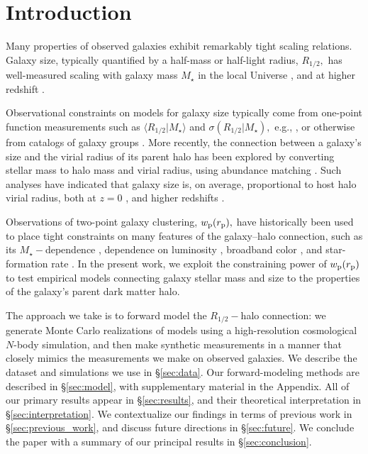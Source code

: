 \documentclass[usenatbib,usegraphicx,letterpaper]{mn2e}
\newcommand{\rhalf}{R_{1/2}}
\newcommand{\mstar}{M_{\star}}
\newcommand{\rproj}{r_{\rm p}}
\newcommand{\wproj}{w_{\rm p}}
\newcommand{\mean}[2]{\langle{#1}\vert{#2}\rangle}
\begin{document}
\section{Introduction}
\label{sec:intro}

Many properties of observed galaxies exhibit remarkably tight scaling relations. Galaxy size, typically quantified by a half-mass or half-light radius, $\rhalf,$ has well-measured scaling with galaxy mass $\mstar$ in the local Universe \citep{shen_etal03,huang_etal13,lange_etal15,zhang_yang17}, and at higher redshift \citep{trujillo_etal04,huertas_company_etal13a,vanderwel_etal14,kawamata_etal15,shibuya_etal15,huang_etal17}.

Observational constraints on models for galaxy size typically come from one-point function measurements such as $\mean{\rhalf}{\mstar}$ and $\sigma(\rhalf\vert\mstar),$ e.g.,  \citet{khochfar_silk06,lang_etal14,desmond_etal17,bottrell_etal17b,hou_etal17,somerville_etal17}, or otherwise from catalogs of galaxy groups \citep{weinmann_etal08,guo_etal09,huertas_company_etal13b,spindler_wake17}. More recently, the connection between a galaxy's size and the virial radius of its parent halo has been
explored by converting stellar mass to halo mass and virial radius, using abundance matching \citep{kravtsov_etal04,tasitsiomi_etal04,vale_ostriker04,vale_ostriker06,conroy_etal06}.  Such analyses have indicated that galaxy size is, on average, proportional to host halo virial radius, both at $z=0$ \citep{kravtsov13}, and higher redshifts \citep{huang_etal17,somerville_etal17}.

Observations of two-point galaxy clustering, $\wproj(\rproj),$ have historically been used to place tight constraints on many features of the galaxy--halo connection, such as its $\mstar-$dependence \citep{moster_etal10,leauthaud_etal11,reddick_etal13,skibba_etal15}, dependence on luminosity \citep{kravtsov_etal04, tasitsiomi_etal04,vale_ostriker04,vale_ostriker06,tinker_etal05,cacciato_etal13}, broadband color \citep{coil_etal08,zehavi_etal11,guo_etal11,hearin_watson13}, and star-formation rate \citep{wang_etal07,tinker_etal13,watson_etal14}. In the present work, we exploit the constraining power of $\wproj(\rproj)$ to test empirical models connecting galaxy stellar mass and size to the properties of the galaxy's parent dark matter halo.

The approach we take is to forward model the $\rhalf-$halo connection: we generate Monte Carlo realizations of models using a high-resolution cosmological $N$-body simulation, and then make synthetic measurements in a manner that closely mimics the measurements we make on observed galaxies. We describe the dataset and simulations we use in \S\ref{sec:data}. Our forward-modeling methods are described in \S\ref{sec:model}, with supplementary material in the Appendix. All of our primary results appear in \S\ref{sec:results}, and their theoretical interpretation in \S\ref{sec:interpretation}. We contextualize our findings in terms of previous work in \S\ref{sec:previous_work}, and discuss future directions in \S\ref{sec:future}. We conclude the paper with a summary of our principal results in \S\ref{sec:conclusion}.
\end{document}

